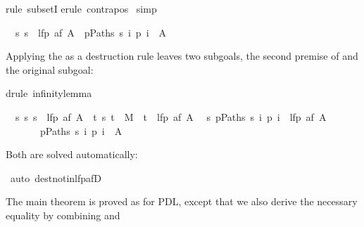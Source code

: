 \begin{isabellebody}
\begin{isamarkuptxt}
\end{isamarkuptxt}%
rule\ subsetI{\isacharparenright}\isanewline
{}erule\ contrapos{}{\isacharparenright}\isanewline
{}\ simp%
\begin{isamarkuptxt}%
\begin{isabelle}
\ \ {\isasymAnd}s{\isachardot}\ s\ {\isasymnotin}\ lfp\ {\isacharparenleft}af\ A{\isacharparenright}\ {\isasymLongrightarrow}\ {\isasymexists}p{\isasymin}Paths\ s{\isachardot}\ {\isasymforall}i{\isachardot}\ p\ i\ {\isasymnotin}\ A
\end{isabelle}
Applying the  as a destruction rule leaves two subgoals, the second
premise of  and the original subgoal:%
\end{isamarkuptxt}%
drule\ infinity{\isacharunderscore}lemma{\isacharparenright}%
\begin{isamarkuptxt}%
\begin{isabelle}
\ \ {\isasymAnd}s{\isachardot}\ {\isasymforall}s{\isachardot}\ s\ {\isasymnotin}\ lfp\ {\isacharparenleft}af\ A{\isacharparenright}\ {\isasymlongrightarrow}\ {\isacharparenleft}{\isasymexists}t{\isachardot}\ {\isacharparenleft}s{\isacharcomma}\ t{\isacharparenright}\ {\isasymin}\ M\ {\isasymand}\ t\ {\isasymnotin}\ lfp\ {\isacharparenleft}af\ A{\isacharparenright}{\isacharparenright}\isanewline
\ \ {\isasymAnd}s{\isachardot}\ {\isasymexists}p{\isasymin}Paths\ s{\isachardot}\ {\isasymforall}i{\isachardot}\ p\ i\ {\isasymnotin}\ lfp\ {\isacharparenleft}af\ A{\isacharparenright}\isanewline
\ \ \ \ \ \ {\isasymLongrightarrow}\ {\isasymexists}p{\isasymin}Paths\ s{\isachardot}\ {\isasymforall}i{\isachardot}\ p\ i\ {\isasymnotin}\ A
\end{isabelle}
Both are solved automatically:%
\end{isamarkuptxt}%
\ auto\ dest{\isacharcolon}not{\isacharunderscore}in{\isacharunderscore}lfp{\isacharunderscore}afD{\isacharparenright}\isanewline
{}%
\begin{isamarkuptext}%
The main theorem is proved as for PDL, except that we also derive the necessary equality
 by combining  and 

\end{isamarkuptext}
\end{isabellebody}
